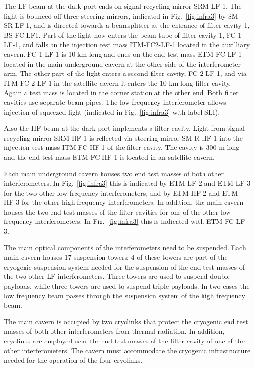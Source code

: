 The LF beam at the dark port ends on signal-recycling mirror SRM-LF-1. The light is bounced off three steering mirrors, indicated in Fig.~\ref{fig:infra3} by SM-SR-LF-1, and is directed towards a beamsplitter at the entrance of filter cavity 1, BS-FC-LF1. Part of the light now enters the beam tube of filter cavity 1, FC-1-LF-1, and falls on the injection test mass ITM-FC2-LF-1 located in the auxilliary cavern. FC-1-LF-1 is 10 km long and ends on the end test mass ETM-FC-LF-1 located in the main underground cavern at the other side of the interferometer arm. The other part of the light enters a second filter cavity, FC-2-LF-1, and via ITM-FC-2-LF-1 in the satellite cavern it enters the 10 km long filter cavity. Again a test mass is located in the corner station at the other end. Both filter cavities use separate beam pipes. The low frequency interferometer allows injection of squeezed light (indicated in Fig.~\ref{fig:infra3} with label SLI). 

Also the HF beam at the dark port implements a filter cavity. Light from signal recycling mirror SRM-HF-1 is reflected via steering mirror SM-R-HF-1 into the injection test mass ITM-FC-HF-1 of the filter cavity. The cavity is 300 m long and the end test mass ETM-FC-HF-1 is located in an satellite cavern.

Each main underground cavern houses two end test masses of both other interferometers. In Fig.~\ref{fig:infra3} this is indicated by ETM-LF-2 and ETM-LF-3 for the two other low-frequency interferometers, and by ETM-HF-2 and ETM-HF-3 for the other high-frequency interferometers. In addition, the main cavern houses the two end test masses of the filter cavities for one of the other low-frequency interferometers. In Fig.~\ref{fig:infra3} this is indicated with ETM-FC-LF-3.

The main optical components of the interferometers need to be suspended. Each main cavern houses 17 suspension towers; 4 of these towers are part of the cryogenic suspension system needed for the suspension of the end test masses of the two other LF interferometers. Three towers are used to suspend double payloads, while three towers are used to suspend triple payloads. In two cases the low frequency beam passes through the suspension system of the high frequency beam. 

The main cavern is occupied by two cryolinks that protect the cryogenic end test masses of both other interferometers from thermal radiation. In addition, cryolinks are employed near the end test masses of the filter cavity of one of the other interferometers. The cavern must accommodate the cryogenic infrastructure needed for the operation of the four cryolinks.

